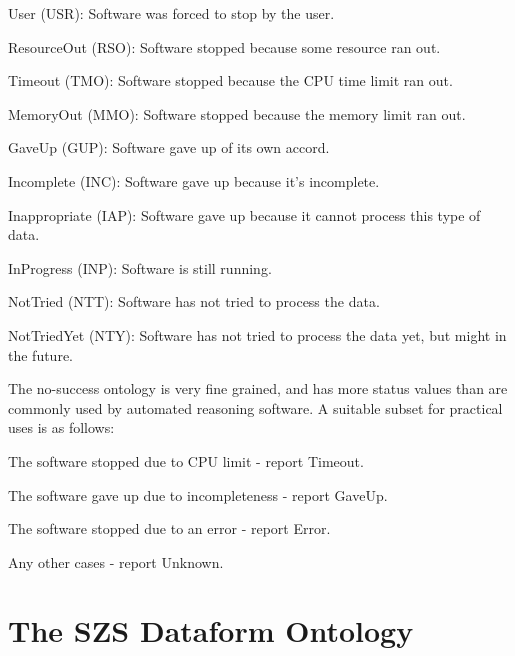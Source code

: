 \documentclass[a4paper]{easychair}
\newenvironment{packed_itemize}{
\vspace*{-0.5em}
\begin{itemize}
  \setlength{\partopsep}{0pt}
  \setlength{\itemsep}{1pt}
  \setlength{\parskip}{0pt}
  \setlength{\parsep}{0pt}
}{\end{itemize}}
\begin{document}
\begin{packed_itemize}
\item User (USR):
      Software was forced to stop by the user.

\item ResourceOut (RSO):
      Software stopped because some resource ran out.

\item Timeout (TMO):
      Software stopped because the CPU time limit ran out.

\item MemoryOut (MMO):
      Software stopped because the memory limit ran out.

\item GaveUp (GUP):
      Software gave up of its own accord.

\item Incomplete (INC):
      Software gave up because it's incomplete.

\item Inappropriate (IAP):
      Software gave up because it cannot process this type of data.

\item InProgress (INP):
      Software is still running.

\item NotTried (NTT):
      Software has not tried to process the data.

\item NotTriedYet (NTY):
      Software has not tried to process the data yet, but might in the future.

\end{packed_itemize}

The no-success ontology is very fine grained, and has more status values
than are commonly used by automated reasoning software.
A suitable subset for practical uses is as follows:
\begin{packed_itemize}
\item The software stopped due to CPU limit - report Timeout.
\item The software gave up due to incompleteness - report GaveUp.
\item The software stopped due to an error - report Error.
\item Any other cases - report Unknown.
\end{packed_itemize}

\section{The SZS Dataform Ontology}
\label{Dataform}
\end{document}

